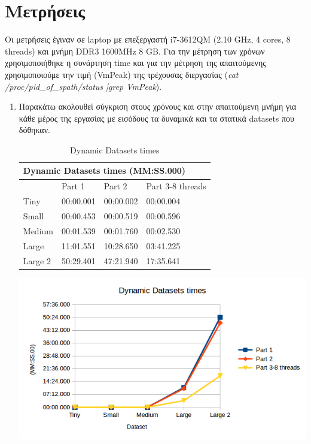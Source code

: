 \documentclass[11pt]{article}
\begin{document}
\section{Μετρήσεις}
Oι μετρήσεις έγιναν σε laptop με επεξεργαστή i7-3612QM (2.10 GHz, 4 cores, 8 threads) και μνήμη DDR3 1600MHz 8 GB. Για την μέτρηση των χρόνων χρησιμοποιήθηκε η συνάρτηση time και για την μέτρηση της απαιτούμενης χρησιμοποιούμε την τιμή (VmPeak) της τρέχουσας διεργασίας (\textit{cat /proc/pid\_of\_spath/status |grep VmPeak}).
\begin{enumerate}
\item Παρακάτω ακολουθεί σύγκριση στους χρόνους και στην απαιτούμενη μνήμη για κάθε μέρος της εργασίας με εισόδους τα δυναμικά και τα στατικά datasets που δόθηκαν.\\
\begin{table}[H]
\caption{Dynamic Datasets times}

\begin{minipage}{.5\textwidth}
\footnotesize
\label{ddt}
\tabcolsep=0.11cm
\begin{tabular}{|l|l|l|l|}
\hline
\multicolumn{4}{|l|}{Dynamic Datasets times (MM:SS.000)} \\ \hline
          & Part 1      & Part 2     & Part 3-8 threads  \\ \hline
Tiny      & 00:00.001   & 00:00.002  & 00:00.004         \\ \hline
Small     & 00:00.453   & 00:00.519  & 00:00.596         \\ \hline
Medium    & 00:01.539   & 00:01.760  & 00:02.530         \\ \hline
Large     & 11:01.551   & 10:28.650  & 03:41.225         \\ \hline
Large 2   & 50:29.401   & 47:21.940  & 17:35.641         \\ \hline
\end{tabular}
\end{minipage}%
\begin{minipage}{.5\textwidth}
\includegraphics[scale=0.5]{DynamicDatasets_times.png}
\end{minipage}%
\end{table}


\end{enumerate}
\end{document}
